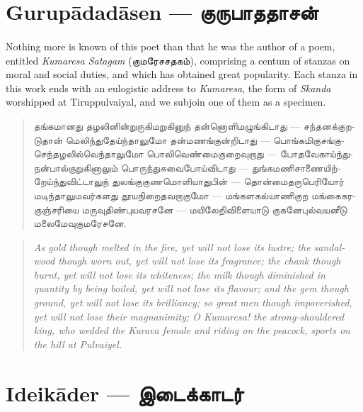 \documentclass{article}
\newcommand{\TamilText}[1]{\texttamil{#1}}
\newcommand{\TamilBold}[1]{\texttamil{\textbf{#1}}}
\newcommand{\tam}[1]{\TamilText{#1}}
\newcommand{\tambold}[1]{\TamilBold{#1}}
\begin{document}
\section{Gurup\={a}dad\={a}sen --- \tambold{குருபாததாசன்}}
\paragraph{}
Nothing more is known of this poet than that he was the author of a poem, entitled \emph{Kumaresa Satagam} (\tam{குமரேசசதகம்}), comprising a centum of stanzas on moral and social duties, and which has obtained great popularity. Each stanza in this work ends with an eulogistic address to \emph{Kumaresa}, the form of \emph{Skanda} worshipped at Tiruppulvaiyal, and we subjoin one of them as a specimen.
\begin{quotation}\small
\tam{தங்கமானது தழலினின்றுருகிமறுகினுந் தன்னொளிமழுங்கிடாது} --- \tam{சந்தனக்குறடுதான்‌ மெலிந்துதேய்ந்தாலுமோ தன்மணங்குன்றிடாது} --- \tam{பொங்கமிகுசங்குசெந்தழலில்வெந்தாலுமோ பொலிவெண்மைகுறைவுறாது} --- \tam{போதவேகாய்ந்துநன்பால்குறுகினாலும்‌ பொருந்துசுவைபோய்விடாது} --- \tam{துங்கமணிசாணையிற்றேய்ந்துவிட்டாலுந் துலங்குகுணமொளியாதுபின்‌} --- \tam{தொன்மைதருபெரியோர்‌ மடிந்தாலுமவர்களது தூயநிறைதவறாகுமோ} --- \tam{மங்களகல்யாணிகுற மங்கைசுரகுஞ்சரியை மருவுதிண்புயவரசனே} --- \tam{மயிலேறிவிளையாடு குகனேபுல்வயனீடு மலைமேவுகுமரேசனே}.
\end{quotation}
\begin{quotation}\small
\emph{As gold though melted in the fire, yet will not lose its lustre; the sandal-wood though worn out, yet will not lose its fragrance; the chank though burnt, yet will not lose its whiteness; the milk though diminished in quantity by being boiled, yet will not lose its flavour; and the gem though ground, yet will not lose its brilliancy; so great men though impoverished, yet will not lose their magnanimity; O Kumaresa! the strong-shouldered king, who wedded the Kurava female and riding on the peacock, sports on the hill at Pulvaiyel.}
\end{quotation}
\section{Ideik\={a}der --- \tambold{இடைக்காடர்}}
\end{document}
